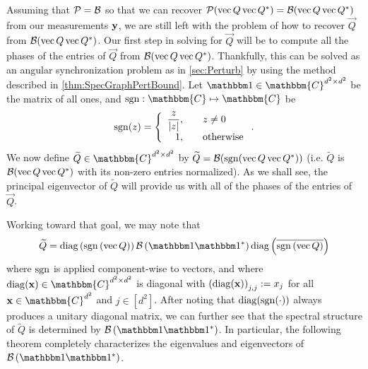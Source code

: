 Assuming that $\mathcal{P} = \mathcal{B}$ so that we can recover $\mathcal{P} ( \operatorname{vec}{Q} \operatorname{vec}{Q}^* ) = \mathcal{B} ( \operatorname{vec}{Q} \operatorname{vec}{Q}^* )$ from our measurements $\mathbf{y}$, we are still left with the problem of how to recover $\vec{Q}$ from $\mathcal{B} ( \operatorname{vec}{Q} \operatorname{vec}{Q}^* )$.  Our first step in solving for $\vec{Q}$ will be to compute all the phases of the entries of $\vec{Q}$ from $\mathcal{B}(\operatorname{vec}{Q} \operatorname{vec}{Q}^*)$.  Thankfully, this can be solved as an angular synchronization problem as in \cref{sec:Perturb} by using the method described in \cref{thm:SpecGraphPertBound}.  Let $\one \in \mathbbm{C}^{d^2 \times d^2}$ be the matrix of all ones, and $\sgn: \mathbbm{C} \mapsto  \mathbbm{C}$ be 
$$\sgn(z) = \left\{\begin{array}{r@{,\qquad}l} \dfrac{z}{|z|} & z \neq 0 \\ 1 & \text{otherwise} \end{array}\right..$$
We now define $\widetilde{Q} \in \mathbbm{C}^{d^2 \times d^2}$ by $\widetilde{Q} = \mathcal{B}(\operatorname{sgn}(\operatorname{vec}{Q} \operatorname{vec}{Q}^*))$ (i.e. $\widetilde{Q}$ is $\mathcal{B}(\operatorname{vec}{Q}\operatorname{vec}{Q}^*)$ with its non-zero entries normalized). %
As we shall see, the principal eigenvector of $\widetilde{Q}$ will provide us with all of the phases of the entries of $\vec{Q}$.

Working toward that goal, we may note that
\begin{equation}
\widetilde{Q} = \diag \left( \sgn \left( \vec{Q} \right) \right) \B \left( \one \one^* \right) \diag \left( \overline{\sgn \left( \vec{Q} \right)} \right)
\label{equ:Qtilde_partial_factor}
\end{equation}
where $\operatorname{sgn}$ is applied component-wise to vectors, and where $\diag(\x)  \in \mathbbm{C}^{d^2 \times d^2}$ is diagonal with $\left(\operatorname{diag}(\mathbf{x})\right)_{j,j} := x_j$ for all $\x \in \mathbbm{C}^{d^2}$ and $j \in [d^2]$.  After noting that $\operatorname{diag}(\operatorname{sgn}(\cdot))$ always produces a unitary diagonal matrix, we can further see that the spectral structure of $\widetilde{Q}$ is determined by $\B \left( \one \one^* \right)$.  In particular, the following theorem completely characterizes the eigenvalues and eigenvectors of $\B \left( \one \one^* \right)$.

